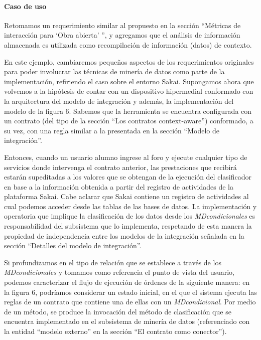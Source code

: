 \begin{itemize}
\paragraph{Caso de uso}

Retomamos un requerimiento similar al propuesto en la sección “Métricas
de interacción para ‘Obra abierta’ ”, y agregamos que el análisis de información
almacenada es utilizada como recompilación de información (datos) de
contexto.

En este ejemplo, cambiaremos pequeños aspectos de los requerimientos
originales para poder involucrar las técnicas de minería de datos como parte
de la implementación, refiriendo el caso sobre el entorno Sakai.
Supongamos ahora que volvemos a la hipótesis de contar con un dispositivo
hipermedial conformado con la arquitectura del modelo de integración y
además, la implementación del modelo de la figura 6. Sabemos que la herramienta
se encuentra configurada con un contrato (del tipo de la sección “Los
contratos context-aware”) conformado, a su vez, con una regla similar a la presentada
en la sección “Modelo de integración”.

Entonces, cuando un usuario alumno ingrese al foro y ejecute cualquier
tipo de servicios donde intervenga el contrato anterior, las prestaciones que
recibirá estarán supeditadas a los valores que se obtengan de la ejecución del
clasificador en base a la información obtenida a partir del registro de actividades
de la plataforma Sakai. Cabe aclarar que Sakai contiene un registro de
actividades al cual podemos acceder desde las tablas de las bases de datos.
La implementación y operatoria que implique la clasificación de los
datos desde los \textit{MDcondicionales} es responsabilidad del subsistema que
lo
implementa, respetando de esta manera la propiedad de independencia entre
los modelos de la integración señalada en la sección “Detalles del modelo de
integración”.

Si profundizamos en el tipo de relación que se establece a través de los
\textit{MDcondicionales} y tomamos como referencia el punto de vista del
usuario,
podemos caracterizar el flujo de ejecución de órdenes de la siguiente manera:
en la figura 6, podríamos considerar un estado inicial, en el que el sistema ejecuta
las reglas de un contrato que contiene una de ellas con un
\textit{MDcondicional}. Por medio de un método, se produce la invocación del
método
de clasificación que se encuentra implementado en el subsistema de minería
de datos (referenciado con la entidad “modelo externo” en la sección “El
contrato como conector”).


\end{itemize}
